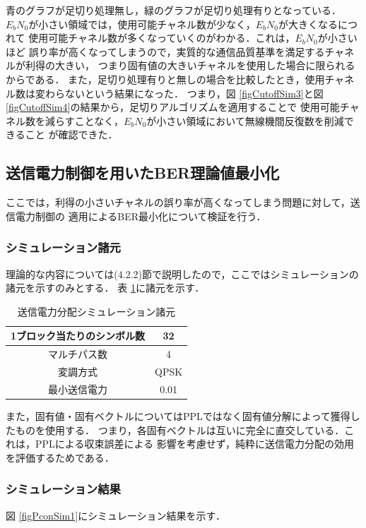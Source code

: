 青のグラフが足切り処理無し，緑のグラフが足切り処理有りとなっている．
$E_bN_0$が小さい領域では，使用可能チャネル数が少なく，$E_bN_0$が大きくなるにつれて
使用可能チャネル数が多くなっていくのがわかる．これは，$E_bN_0$が小さいほど
誤り率が高くなってしまうので，実質的な通信品質基準を満足するチャネルが利得の大きい，
つまり固有値の大きいチャネルを使用した場合に限られるからである．
また，足切り処理有りと無しの場合を比較したとき，使用チャネル数は変わらないという結果になった．
つまり，図 \ref{figCutoffSim3}と図 \ref{figCutoffSim4}の結果から，足切りアルゴリズムを適用することで
使用可能チャネル数を減らすことなく，$E_bN_0$が小さい領域において無線機間反復数を削減できること
が確認できた．

\subsection{送信電力制御を用いたBER理論値最小化}
ここでは，利得の小さいチャネルの誤り率が高くなってしまう問題に対して，送信電力制御の
適用によるBER最小化について検証を行う．

\subsubsection{シミュレーション諸元}
理論的な内容については(4.2.2)節で説明したので，ここではシミュレーションの諸元を示すのみとする．
表 \ref{tabPcon1}に諸元を示す．

\begin{table}[ht]
    \begin{tabular}{|c|c|} \hline
        1ブロック当たりのシンボル数 & 32 \\ \hline
        マルチパス数 & 4 \\ \hline
        変調方式 & QPSK \\ \hline
        最小送信電力 & 0.01 \\ \hline
    \end{tabular}
    \centering
    \caption{送信電力分配シミュレーション諸元}
    \label{tabPcon1}
\end{table}

また，固有値・固有ベクトルについてはPPLではなく固有値分解によって獲得したものを使用する．
つまり，各固有ベクトルは互いに完全に直交している．これは，PPLによる収束誤差による
影響を考慮せず，純粋に送信電力分配の効用を評価するためである．

\subsubsection{シミュレーション結果}
図 \ref{figPconSim1}にシミュレーション結果を示す．

